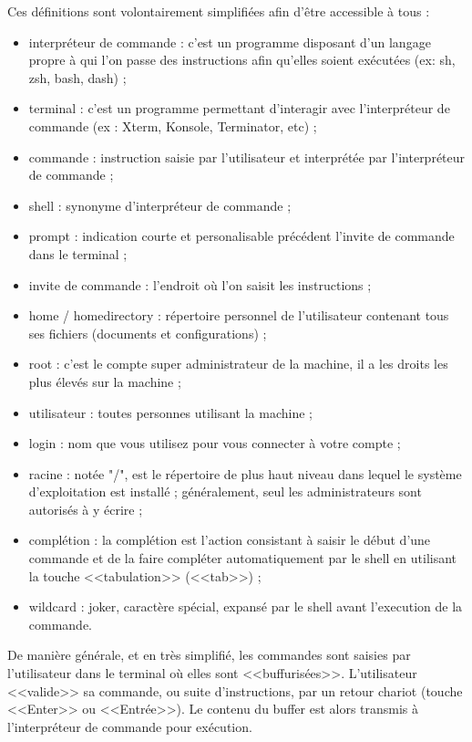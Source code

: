 \documentclass[11pt]{article}
\begin{document}
\begin{solution}
 Ces définitions sont volontairement simplifiées afin d'être accessible à tous :

 \begin{itemize}
  \item{interpréteur de commande} : c'est un programme disposant d'un langage propre à qui l'on passe des
instructions afin qu'elles soient exécutées (ex: sh, zsh, bash, dash) ;
  \item{terminal} : c'est un programme permettant d'interagir avec l'interpréteur de commande (ex : Xterm, Konsole, Terminator, etc) ;
  \item{commande} : instruction saisie par l'utilisateur et interprétée par l'interpréteur de commande ;
  \item{shell} : synonyme d'interpréteur de commande ;
  \item{prompt} : indication courte et personalisable précédent l'invite de commande dans le terminal ;
  \item{invite de commande} : l'endroit où l'on saisit les instructions ;
  \item{home / homedirectory} : répertoire personnel de l'utilisateur contenant tous ses fichiers (documents
et configurations) ;
  \item{root} : c'est le compte super administrateur de la machine, il a les droits les plus élevés sur la machine ;
  \item{utilisateur} : toutes personnes utilisant la machine ;
  \item{login} : nom que vous utilisez pour vous connecter à votre compte ;
  \item{racine} : notée "/", est le répertoire de plus haut niveau dans lequel le système d'exploitation est installé ;
généralement, seul les administrateurs sont autorisés à y écrire ;
  \item{complétion} : la complétion est l'action consistant à saisir le début d'une commande et de la faire compléter automatiquement par le shell en utilisant la touche <<tabulation>> (<<tab>>) ;
  \item{wildcard} : joker, caractère spécial, expansé par le shell avant l'execution de la commande.
 \end{itemize}
\end{solution}

De manière générale, et en très simplifié, les commandes sont saisies par l'utilisateur dans le terminal où elles sont <<buffurisées>>. L'utilisateur <<valide>> sa commande, ou suite d'instructions, par un retour chariot (touche <<Enter>> ou <<Entrée>>). Le contenu du buffer est alors transmis à l'interpréteur de commande pour exécution.
\end{document}
